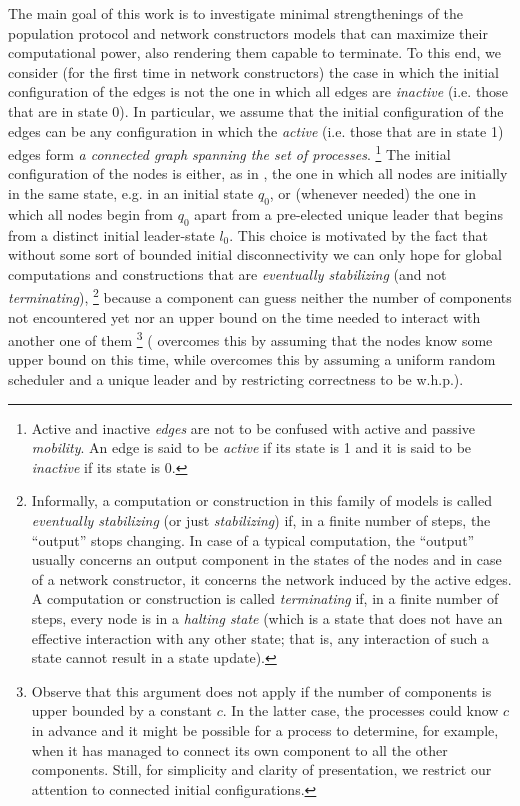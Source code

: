 \documentclass[preprint]{elsarticle}
\begin{document}
The main goal of this work is to investigate minimal strengthenings of the population protocol and network constructors models that can maximize their computational power, also rendering them capable to terminate. To this end, we consider (for the first time in network constructors) the case in which the initial configuration of the edges is not the one in which all edges are \emph{inactive} (i.e. those that are in state 0). In particular, we assume that the initial configuration of the edges can be any configuration in which the \emph{active} (i.e. those that are in state 1) edges form \emph{a connected graph spanning the set of processes}. \footnote{Active and inactive \emph{edges} are not to be confused with active and passive \emph{mobility}. An edge is said to be \emph{active} if its state is 1 and it is said to be \emph{inactive} if its state is 0.} The initial configuration of the nodes is either, as in \cite{MS14}, the one in which all nodes are initially in the same state, e.g. in an initial state $q_0$, or (whenever needed) the one in which all nodes begin from $q_0$ apart from a pre-elected unique leader that begins from a distinct initial leader-state $l_0$. This choice is motivated by the fact that without some sort of bounded initial disconnectivity we can only hope for global computations and constructions that are \emph{eventually stabilizing} (and not \emph{terminating}), \footnote{Informally, a computation or construction in this family of models is called \emph{eventually stabilizing} (or just \emph{stabilizing}) if, in a finite number of steps, the ``output'' stops changing. In case of a typical computation, the  ``output'' usually concerns an output component in the states of the nodes and in case of a network constructor, it concerns the network induced by the active edges. A computation or construction is called \emph{terminating} if, in a finite number of steps, every node is in a \emph{halting state} (which is a state that does not have an effective interaction with any other state; that is, any interaction of such a state cannot result in a state update).} because a component can guess neither the number of components not encountered yet nor an upper bound on the time needed to interact with another one of them \footnote{Observe that this argument does not apply if the number of components is upper bounded by a constant $c$. In the latter case, the processes could know $c$ in advance and it might be possible for a process to determine, for example, when it has managed to connect its own component to all the other components. Still, for simplicity and clarity of presentation, we restrict our attention to connected initial configurations.}  (\cite{MS15} overcomes this by assuming that the nodes know some upper bound on this time, while \cite{Mi15} overcomes this by assuming a uniform random scheduler and a unique leader and by restricting correctness to be w.h.p.). 
\end{document}
